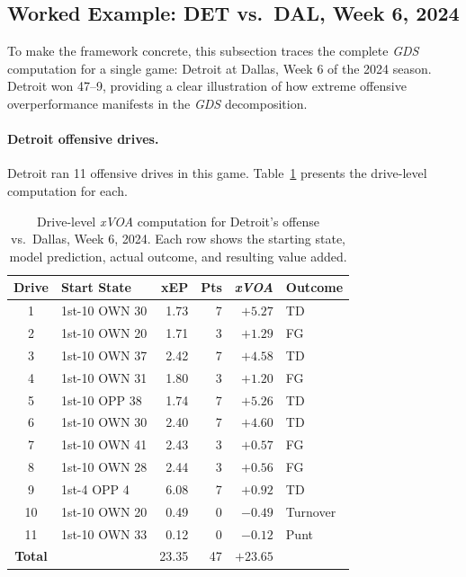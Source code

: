 \documentclass[12pt,a4paper]{article}
\newcommand{\xvoa}{\textit{xVOA}}
\newcommand{\gds}{\textit{GDS}}
\begin{document}
\subsection{Worked Example: DET vs.\ DAL, Week 6, 2024}
\label{sec:worked-example}

To make the framework concrete, this subsection traces the complete \gds{} computation for a single game: Detroit at Dallas, Week 6 of the 2024 season. Detroit won 47--9, providing a clear illustration of how extreme offensive overperformance manifests in the \gds{} decomposition.

\paragraph{Detroit offensive drives.}
Detroit ran 11 offensive drives in this game. Table~\ref{tab:worked-drives} presents the drive-level computation for each.

\begin{table}[htbp]
  \centering
  \caption{Drive-level \xvoa{} computation for Detroit's offense vs.\ Dallas, Week 6, 2024. Each row shows the starting state, model prediction, actual outcome, and resulting value added.}
  \label{tab:worked-drives}
  \small
  \begin{tabular}{clrrrl}
    \toprule
    \textbf{Drive} & \textbf{Start State} & \textbf{xEP} & \textbf{Pts} & \textbf{\xvoa{}} & \textbf{Outcome} \\
    \midrule
    1  & 1st-10 OWN 30 & 1.73 & 7 & $+5.27$ & TD \\
    2  & 1st-10 OWN 20 & 1.71 & 3 & $+1.29$ & FG \\
    3  & 1st-10 OWN 37 & 2.42 & 7 & $+4.58$ & TD \\
    4  & 1st-10 OWN 31 & 1.80 & 3 & $+1.20$ & FG \\
    5  & 1st-10 OPP 38 & 1.74 & 7 & $+5.26$ & TD \\
    6  & 1st-10 OWN 30 & 2.40 & 7 & $+4.60$ & TD \\
    7  & 1st-10 OWN 41 & 2.43 & 3 & $+0.57$ & FG \\
    8  & 1st-10 OWN 28 & 2.44 & 3 & $+0.56$ & FG \\
    9  & 1st-4 OPP 4   & 6.08 & 7 & $+0.92$ & TD \\
    10 & 1st-10 OWN 20 & 0.49 & 0 & $-0.49$ & Turnover \\
    11 & 1st-10 OWN 33 & 0.12 & 0 & $-0.12$ & Punt \\
    \midrule
    \textbf{Total} & & 23.35 & 47 & $+23.65$ & \\
    \bottomrule
  \end{tabular}
\end{table}
\end{document}
